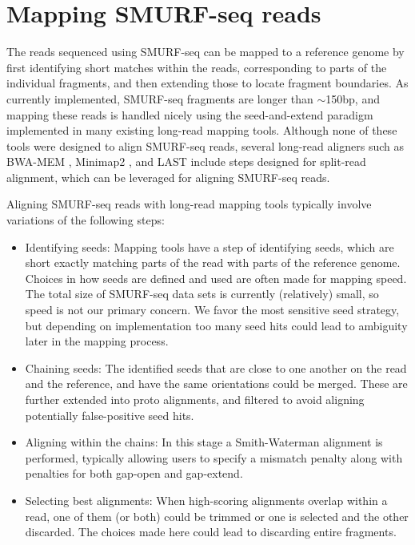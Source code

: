 \section{Mapping SMURF-seq reads}
The reads sequenced using SMURF-seq can be mapped to a reference genome
by first identifying short matches within the reads, corresponding to
parts of the individual fragments, and then extending those to locate
fragment boundaries.
%
As currently implemented, SMURF-seq fragments are longer than
$\sim$150bp, and mapping these reads is handled nicely using the
seed-and-extend paradigm implemented in many existing long-read mapping
tools.
%
Although none of these tools were designed to align SMURF-seq reads,
several long-read aligners such as BWA-MEM \citep{li2013aligning},
Minimap2 \citep{li2018minimap2}, and LAST \citep{kielbasa2011adaptive}
include steps designed for split-read alignment, which can be leveraged
for aligning SMURF-seq reads.

Aligning SMURF-seq reads with long-read mapping tools typically involve
variations of the following steps:
\begin{itemize}
\item Identifying seeds: Mapping tools have a step of identifying seeds,
  which are short exactly matching parts of the read with parts of the
  reference genome. Choices in how seeds are defined and used are often
  made for mapping speed. The total size of SMURF-seq data sets is
  currently (relatively) small, so speed is not our primary concern. We
  favor the most sensitive seed strategy, but depending on implementation
  too many seed hits could lead to ambiguity later in the mapping process.
\item Chaining seeds: The identified seeds that are close to one another
  on the read and the reference, and have the same orientations
  could be merged. These are further extended into proto alignments, and
  filtered to avoid aligning potentially false-positive seed hits.
\item Aligning within the chains: In this stage a Smith-Waterman
  alignment is performed, typically allowing users to specify a mismatch
  penalty along with penalties for both gap-open and gap-extend.
\item Selecting best alignments: When high-scoring alignments overlap
  within a read, one of them (or both) could be trimmed or one is selected
  and the other discarded. The choices made here could lead to discarding
  entire fragments.
\end{itemize}

